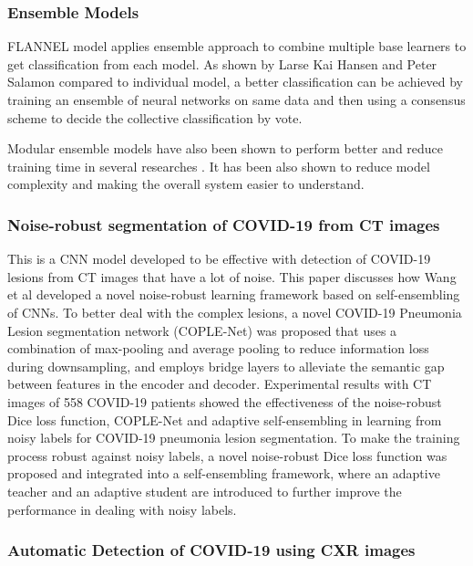 \documentclass{sigkddExp}
\begin{document}
\subsubsection{Ensemble Models}

FLANNEL model applies ensemble approach to combine multiple base learners to get
classification from each model. As shown by Larse Kai Hansen and Peter Salamon
\cite{58871} compared to individual model, a better classification can be achieved
by training an ensemble of neural networks on same data and then using a
consensus scheme to decide the collective classification by vote.

Modular ensemble models have also been shown to perform better and reduce
training time in several researches \cite{combine}. It has been also shown to
reduce model complexity and making the overall system easier to understand.


\subsubsection{Noise-robust segmentation of COVID-19 from CT images}

This is a CNN model \cite{pmid32730215} developed to be effective with
detection of COVID-19 lesions from CT images that have a lot of noise. This
paper discusses how Wang et al developed a novel noise-robust learning framework
based on self-ensembling of CNNs.  To better deal with the complex lesions, a
novel COVID-19 Pneumonia Lesion segmentation network (COPLE-Net) was proposed
that uses a combination of max-pooling and average pooling to reduce information
loss during downsampling, and employs bridge layers to alleviate the semantic
gap between features in the encoder and decoder. Experimental results with CT
images of 558 COVID-19 patients showed the effectiveness of the noise-robust
Dice loss function, COPLE-Net and adaptive self-ensembling in learning from
noisy labels for COVID-19 pneumonia lesion segmentation. To make the training
process robust against noisy labels, a novel noise-robust Dice loss function was
proposed and integrated into a self-ensembling framework, where an adaptive
teacher and an adaptive student are introduced to further improve the
performance in dealing with noisy labels.


\subsubsection{Automatic Detection of COVID-19 using CXR images}
\end{document}
